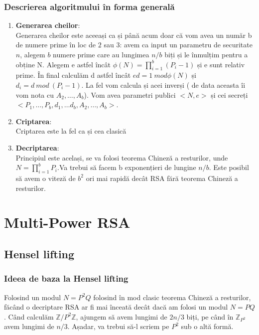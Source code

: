 \documentclass[12]{report}
\begin{document}
		 \subsubsection{Descrierea algoritmului în forma generală}
		 \begin{enumerate}
		 \item \textbf{Generarea cheilor}: \\
		 Generarea cheilor este aceeași ca și până acum doar că vom avea un număr b de numere prime în loc de $2$ sau $3$: avem ca input un parametru de securitate $n$, alegem $b$ numere prime care au lungimea $n/b$ biți și le înmulțim pentru a obține N. Alegem e astfel încât $\phi(N)=\prod_{i=1}^{b}(P_i -1)$ și e sunt relativ prime. În final calculăm d astfel încât $ed=1 \ mod \phi(N)$ și $d_i = d \ mod \ (P_i -1)$. La fel vom calcula și acei inverși ( de data aceasta îi vom nota cu $A_2, \dots ,A_b$). Vom avea parametri publici $<N,e>$ și cei secreți $<P_1, \dots ,P_b,d_1, \dots d_b,A_2, \dots ,A_b>$.
		 
		 \item \textbf{Criptarea}: \\
		 Criptarea este la fel ca și cea clasică
		 \item \textbf{Decriptarea}: \\
		 Principiul este același, se va folosi teorema Chineză a resturilor, unde $N=\prod_{i=1}^{b} P_i$.Va trebui să facem b exponențieri de lungine $n/b$. Este posibil să avem o viteză de $b^2$ ori mai rapidă decât RSA fără teorema Chineză a resturilor.
		 \end{enumerate}
		
		\section{Multi-Power RSA}
		 \subsection{Hensel lifting}
		  \subsubsection{Ideea de baza la Hensel lifting}
		  Folosind un modul $N=P^2Q$ folosind în mod clasic teorema Chineză a resturilor, făcând o decriptare RSA ar fi mai înceată decât dacă am folosi un modul $ N=PQ$. Când calculăm $ \mathbb{Z}/P^2\mathbb{Z}$, ajungem să avem lungimi de $2n/3$ biți, pe când în $\mathbb{Z}_{P^2}$ avem lungimi de $n/3$. Așadar, va trebui să-l scriem pe $P^2$ sub o altă formă.
\end{document}
